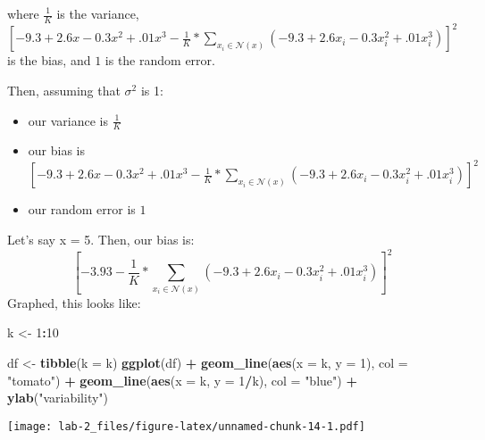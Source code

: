 \documentclass[]{article}
\newenvironment{Shaded}{\begin{snugshade}}{\end{snugshade}}
\newcommand{\KeywordTok}[1]{\textcolor[rgb]{0.13,0.29,0.53}{\textbf{#1}}}
\newcommand{\DataTypeTok}[1]{\textcolor[rgb]{0.13,0.29,0.53}{#1}}
\newcommand{\DecValTok}[1]{\textcolor[rgb]{0.00,0.00,0.81}{#1}}
\newcommand{\StringTok}[1]{\textcolor[rgb]{0.31,0.60,0.02}{#1}}
\newcommand{\OperatorTok}[1]{\textcolor[rgb]{0.81,0.36,0.00}{\textbf{#1}}}
\newcommand{\NormalTok}[1]{#1}
\providecommand{\tightlist}{%
  \setlength{\itemsep}{0pt}\setlength{\parskip}{0pt}}
\begin{document}
where \(\frac{1}{K}\) is the variance,
\([-9.3 + 2.6 x - 0.3 x^2 + .01 x^3 - \frac{1}{K} * \sum_{x_i \in \mathcal{N}(x)} (-9.3 + 2.6 x_i - 0.3 x_i^2 + .01 x_i^3)]^2\)
is the bias, and \(1\) is the random error.

Then, assuming that \(\sigma^2\) is 1:

\begin{itemize}
\tightlist
\item
  our variance is \(\frac{1}{K}\)
\item
  our bias is
  \([-9.3 + 2.6 x - 0.3 x^2 + .01 x^3 - \frac{1}{K} * \sum_{x_i \in \mathcal{N}(x)} (-9.3 + 2.6 x_i - 0.3 x_i^2 + .01 x_i^3)]^2\)
\item
  our random error is \(1\)
\end{itemize}

Let's say x = 5. Then, our bias is:
\[[-3.93- \frac{1}{K} * \sum_{x_i \in \mathcal{N}(x)} (-9.3 + 2.6 x_i - 0.3 x_i^2 + .01 x_i^3)]^2\]
Graphed, this looks like:

\begin{Shaded}
\begin{Highlighting}[]
\NormalTok{k <-}\StringTok{ }\DecValTok{1}\OperatorTok{:}\DecValTok{10}

\NormalTok{df <-}\StringTok{ }\KeywordTok{tibble}\NormalTok{(}\DataTypeTok{k =}\NormalTok{ k)}
\KeywordTok{ggplot}\NormalTok{(df) }\OperatorTok{+}\StringTok{ }\KeywordTok{geom_line}\NormalTok{(}\KeywordTok{aes}\NormalTok{(}\DataTypeTok{x =}\NormalTok{ k, }\DataTypeTok{y =} \DecValTok{1}\NormalTok{), }\DataTypeTok{col =} \StringTok{"tomato"}\NormalTok{) }\OperatorTok{+}
\StringTok{  }\KeywordTok{geom_line}\NormalTok{(}\KeywordTok{aes}\NormalTok{(}\DataTypeTok{x =}\NormalTok{ k, }\DataTypeTok{y =} \DecValTok{1}\OperatorTok{/}\NormalTok{k), }\DataTypeTok{col =} \StringTok{"blue"}\NormalTok{) }\OperatorTok{+}
\StringTok{  }\KeywordTok{ylab}\NormalTok{(}\StringTok{"variability"}\NormalTok{)}
\end{Highlighting}
\end{Shaded}

\texttt{[image: lab-2\_files/figure-latex/unnamed-chunk-14-1.pdf]}
\end{document}
